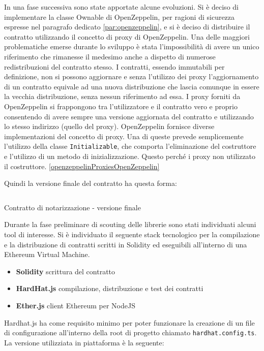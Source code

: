 \documentclass[a4paper,11pt]{article}
\begin{document}
In una fase successiva sono state apportate alcune evoluzioni. Si è deciso di implementare la classe Ownable di OpenZeppelin, per ragioni di sicurezza espresse nel paragrafo dedicato \ref{par:openzeppelin}, e si è deciso di distribuire il contratto utilizzando il concetto di proxy di OpenZeppelin. Una delle maggiori problematiche emerse durante lo sviluppo è stata l'impossibilità di avere un unico riferimento che rimanesse il medesimo anche a dispetto di numerose redistribuzioni del contratto stesso. I contratti, essendo immutabili per definizione, non si possono aggiornare e senza l'utilizzo dei proxy l'aggiornamento di un contratto equivale ad una nuova distribuzione che lascia comunque in essere la vecchia distribuzione, senza nessun riferimento ad essa. I proxy forniti da OpenZeppelin si frappongono tra l'utilizzatore e il contratto vero e proprio consentendo di avere sempre una versione aggiornata del contratto e utilizzando lo stesso indirizzo (quello del proxy). OpenZeppelin fornisce diverse implementazioni del concetto di proxy. Una di queste prevede semplicemente l'utilizzo della classe \texttt{Initializable}, che comporta l'eliminazione del costruttore e l'utilizzo di un metodo di inizializzazione. Questo perché i proxy non utilizzato il costruttore. \ref{openzeppelinProxiesOpenZeppelin}

Quindi la versione finale del contratto ha questa forma:

\begin{listing}[H]
  \inputminted{solidity}{./code/Hash.v2.sol}
  \caption{Contratto di notarizzazione - versione finale}
  \label{listing:hash2}
\end{listing}

Durante la fase preliminare di scouting delle librerie sono stati individuati alcuni tool di interesse. Si è individuato il seguente stack tecnologico per la compilazione e la distribuzione di contratti scritti in Solidity ed eseguibili all'interno di una Ethereum Virtual Machine.

\begin{itemize}
  \item \textbf{Solidity} scrittura del contratto
  \item \textbf{HardHat.js} compilazione, distribuzione e test dei contratti
  \item \textbf{Ether.js} client Ethereum per NodeJS
\end{itemize}

Hardhat.js ha come requisito minimo per poter funzionare la creazione di un file di configurazione all'interno della root di progetto chiamato \texttt{hardhat.config.ts}. La versione utilizziata in piattaforma è la seguente:
\end{document}
